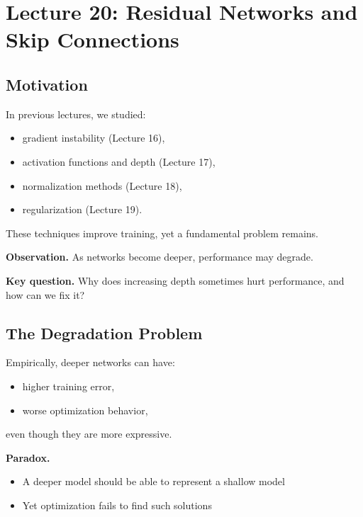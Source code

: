 \section{Lecture 20: Residual Networks and Skip Connections}

\subsection{Motivation}

In previous lectures, we studied:

\begin{itemize}
    \item gradient instability (Lecture 16),
    \item activation functions and depth (Lecture 17),
    \item normalization methods (Lecture 18),
    \item regularization (Lecture 19).
\end{itemize}

\medskip

\noindent
These techniques improve training, yet a fundamental problem remains.

\medskip

\noindent
\textbf{Observation.}  
As networks become deeper, performance may degrade.

\medskip

\noindent
\textbf{Key question.}  
Why does increasing depth sometimes hurt performance, and how can we fix it?

\subsection{The Degradation Problem}

Empirically, deeper networks can have:

\begin{itemize}
    \item higher training error,
    \item worse optimization behavior,
\end{itemize}

even though they are more expressive.

\medskip

\noindent
\textbf{Paradox.}
\begin{itemize}
    \item A deeper model should be able to represent a shallow model
    \item Yet optimization fails to find such solutions
\end{itemize}

